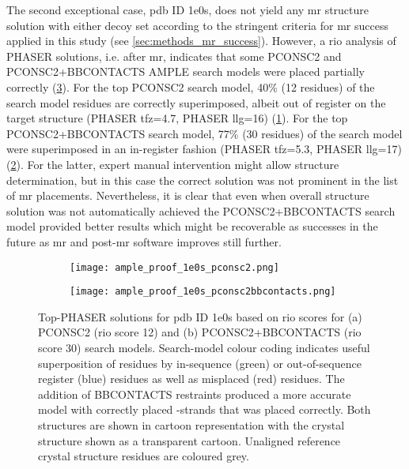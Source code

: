 The second exceptional case, \gls{pdb} ID 1e0s, does not yield any \gls{mr} structure solution with either decoy set according to the stringent criteria for \gls{mr} success applied in this study (see \cref{sec:methods_mr_success}). However, a \gls{rio} analysis of PHASER solutions, i.e. after \gls{mr}, indicates that some PCONSC2 and PCONSC2+BBCONTACTS AMPLE search models were placed partially correctly (\cref{fig:ample_proof_example_1e0s}). For the top PCONSC2 search model, 40\% (12 residues) of the search model residues are correctly superimposed, albeit out of register on the target structure (PHASER \gls{tfz}=4.7, PHASER \gls{llg}=16) (\cref{fig:ample_proof_1e0s_pconsc2}). For the top PCONSC2+BBCONTACTS search model, 77\% (30 residues) of the search model were superimposed in an in-register fashion (PHASER \gls{tfz}=5.3, PHASER \gls{llg}=17) (\cref{fig:ample_proof_1e0s_pconsc2bbcontacts}). For the latter, expert manual intervention might allow structure determination, but in this case the correct solution was not prominent in the list of \gls{mr} placements. Nevertheless, it is clear that even when overall structure solution was not automatically achieved the PCONSC2+BBCONTACTS search model provided better results which might be recoverable as successes in the future as \gls{mr} and post-\gls{mr} software improves still further.

\begin{figure}[H]
    \centering
    \begin{subfigure}[b]{0.48\textwidth}
        \centering
        \texttt{[image: ample\_proof\_1e0s\_pconsc2.png]}
        \caption{}
        \label{fig:ample_proof_1e0s_pconsc2}
    \end{subfigure}
    \begin{subfigure}[b]{0.48\textwidth}
        \centering
        \texttt{[image: ample\_proof\_1e0s\_pconsc2bbcontacts.png]}
        \caption{}
        \label{fig:ample_proof_1e0s_pconsc2bbcontacts}
    \end{subfigure}

    \caption[Top-PHASER solutions for target 1e0s]{Top-PHASER solutions for \gls{pdb} ID 1e0s based on \gls{rio} scores for (a) PCONSC2 (\gls{rio} score 12) and (b) PCONSC2+BBCONTACTS (\gls{rio} score 30) search models. Search-model colour coding indicates useful superposition of residues by in-sequence (green) or out-of-sequence register (blue) residues as well as misplaced (red) residues. The addition of BBCONTACTS restraints produced a more accurate model with correctly placed \textbeta-strands that was placed correctly. Both structures are shown in cartoon representation with the crystal structure shown as a transparent cartoon. Unaligned reference crystal structure residues are coloured grey.}
    \label{fig:ample_proof_example_1e0s}
\end{figure}

